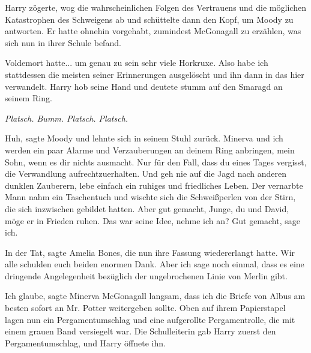 Harry zögerte, wog die wahrscheinlichen Folgen des Vertrauens und die möglichen
Katastrophen des Schweigens ab und schüttelte dann den Kopf, um Moody zu
antworten. Er hatte ohnehin vorgehabt, zumindest McGonagall zu erzählen, was
sich nun in ihrer Schule befand.

\glqq{}Voldemort hatte... um genau zu sein sehr viele Horkruxe. Also habe ich
stattdessen die meisten seiner Erinnerungen ausgelöscht und ihn dann in das hier
verwandelt.\grqq{} Harry hob seine Hand und deutete stumm auf den Smaragd an seinem
Ring.

\emph{Platsch. Bumm. Platsch. Platsch.}

\glqq{}Huh\grqq{}, sagte Moody und lehnte sich in seinem Stuhl zurück. \glqq{}
Minerva und ich werden ein paar Alarme und Verzauberungen an deinem Ring
anbringen, mein Sohn, wenn es dir nichts ausmacht. Nur für den Fall, dass du
eines Tages vergisst, die Verwandlung aufrechtzuerhalten. Und geh nie auf die
Jagd nach anderen dunklen Zauberern, lebe einfach ein ruhiges und friedliches
Leben.\grqq{} Der vernarbte Mann nahm ein Taschentuch und wischte sich die
Schweißperlen von der Stirn, die sich inzwischen gebildet hatten. \glqq{}Aber gut
gemacht, Junge, du und David, möge er in Frieden ruhen. Das war seine Idee,
nehme ich an? Gut gemacht, sage ich.\grqq{}

\glqq{}In der Tat\grqq{}, sagte Amelia Bones, die nun ihre Fassung wiedererlangt
hatte. \glqq{}Wir alle schulden euch beiden enormen Dank. Aber ich sage noch
einmal, dass es eine dringende Angelegenheit bezüglich der ungebrochenen Linie
von Merlin gibt.\grqq{}

\glqq{}Ich glaube\grqq{}, sagte Minerva McGonagall langsam, \glqq{}dass ich die
Briefe von Albus am besten sofort an Mr. Potter weitergeben sollte.\grqq{} Oben auf
ihrem Papierstapel lagen nun ein Pergamentumschlag und eine aufgerollte
Pergamentrolle, die mit einem grauen Band versiegelt war. Die Schulleiterin gab
Harry zuerst den Pergamentumschlag, und Harry öffnete ihn.

